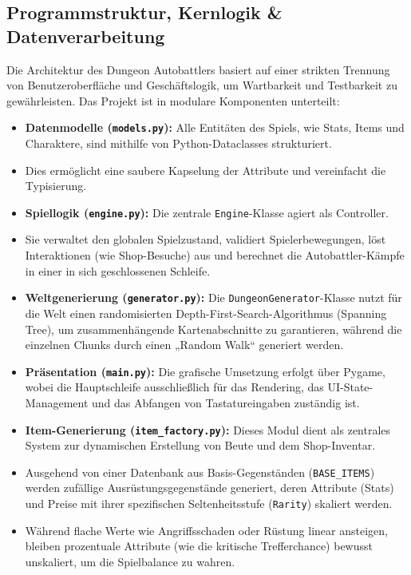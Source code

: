 \documentclass[12pt, a4paper]{article}
\begin{document}
\subsection{Programmstruktur, Kernlogik \& Datenverarbeitung}
Die Architektur des Dungeon Autobattlers basiert auf einer strikten Trennung von Benutzeroberfläche und Geschäftslogik, um Wartbarkeit und Testbarkeit zu gewährleisten.
Das Projekt ist in modulare Komponenten unterteilt:
\begin{itemize}
    \item \textbf{Datenmodelle (\texttt{models.py}):} Alle Entitäten des Spiels, wie Stats, Items und Charaktere, sind mithilfe von Python-Dataclasses strukturiert.
    \item Dies ermöglicht eine saubere Kapselung der Attribute und vereinfacht die Typisierung.
    \item \textbf{Spiellogik (\texttt{engine.py}):} Die zentrale \texttt{Engine}-Klasse agiert als Controller.
    \item Sie verwaltet den globalen Spielzustand, validiert Spielerbewegungen, löst Interaktionen (wie Shop-Besuche) aus und berechnet die Autobattler-Kämpfe in einer in sich geschlossenen Schleife.
    \item \textbf{Weltgenerierung (\texttt{generator.py}):} Die \texttt{DungeonGenerator}-Klasse nutzt für die Welt einen randomisierten Depth-First-Search-Algorithmus (Spanning Tree), um zusammenhängende Kartenabschnitte zu garantieren, während die einzelnen Chunks durch einen „Random Walk“ generiert werden.
    \item \textbf{Präsentation (\texttt{main.py}):} Die grafische Umsetzung erfolgt über Pygame, wobei die Hauptschleife ausschließlich für das Rendering, das UI-State-Management und das Abfangen von Tastatureingaben zuständig ist.
    \item \textbf{Item-Generierung (\texttt{item\_factory.py}):} Dieses Modul dient als zentrales System zur dynamischen Erstellung von Beute und dem Shop-Inventar.
    \item Ausgehend von einer Datenbank aus Basis-Gegenständen (\texttt{BASE\_ITEMS}) werden zufällige Ausrüstungsgegenstände generiert, deren Attribute (Stats) und Preise mit ihrer spezifischen Seltenheitsstufe (\texttt{Rarity}) skaliert werden.
    \item Während flache Werte wie Angriffsschaden oder Rüstung linear ansteigen, bleiben prozentuale Attribute (wie die kritische Trefferchance) bewusst unskaliert, um die Spielbalance zu wahren.
\end{itemize}
\end{document}
